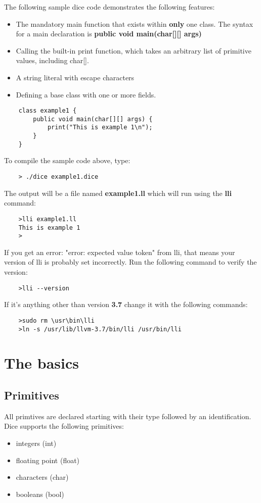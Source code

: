 \begin{homeworkProblem}
	The following sample dice code demonstrates the following features:
	\begin{itemize}
		\item The mandatory main function that exists within \textbf{only} one class. The syntax for a main declaration is \textbf{public void main(char[][] args)}
		\item Calling the built-in print function, which takes an arbitrary list of primitive values, including char[]. 
		\item A string literal with escape characters
		\item Defining a base class with one or more fields. 
	\end{itemize}
	\begin{verbatim}
	class example1 {
		public void main(char[][] args) {
			print("This is example 1\n");
		}
	}
	\end{verbatim}
	To compile the sample code above, type:
	\begin{verbatim}
	> ./dice example1.dice
	\end{verbatim}
	The output will be a file named \textbf{example1.ll} which will run using the \textbf{lli} command:
	\begin{verbatim}
	>lli example1.ll
	This is example 1
	>
	\end{verbatim}
	If you get an error: "error: expected value token" from lli, that means your version of lli is probably set incorrectly. Run the following command to verify the version:
	\begin{verbatim}
	>lli --version
	\end{verbatim}
	If it's anything other than version \textbf{3.7} change it with the following commands:
	\begin{verbatim}
	>sudo rm \usr\bin\lli
	>ln -s /usr/lib/llvm-3.7/bin/lli /usr/bin/lli
	\end{verbatim}

	\pagebreak
	\section{The basics}
	\subsection{Primitives}
	All primtives are declared starting with their type followed by an identification. Dice supports the following primitives:
	\begin{itemize}
		\item integers (int)
		\item floating point (float)
		\item characters (char)
		\item booleans (bool)
	\end{itemize}


\end{homeworkProblem}
